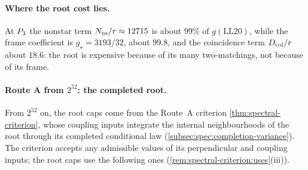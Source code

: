 \paragraph{Where the root cost lies.} At $P_3$ the nonstar term
$N_{\rm ns}/r\approx12715$ is about $99\%$ of $g(\mathrm{LL20})$, while the frame
coefficient is $g_\star=3193/32$, about $99.8$, and the coincidence term
$D_{\rm col}/r$ about $18.6$: the root is expensive because of its many
two-matchings, not because of its frame.

\paragraph{Route A from $2^{52}$: the completed root.}
From $2^{52}$ on, the root caps come from the Route~A criterion
\cref{thm:spectral-criterion}, whose coupling inputs integrate the internal
neighbourhoods of the root through its completed conditional law
(\cref{subsec:spec:completion-variance}). The criterion accepts any admissible values
of its perpendicular and coupling inputs; the root caps use the following ones
(\cref{rem:spectral-criterion:uses}(iii)).

